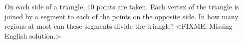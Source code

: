 \problem
On each side of a triangle, $10$ points are taken.
Each vertex of the triangle is joined by a segment to each of the points on the
opposite side.
In how many regions at most can these segments divide the triangle?
\solution
<FIXME: Missing English solution.>
\endproblem
